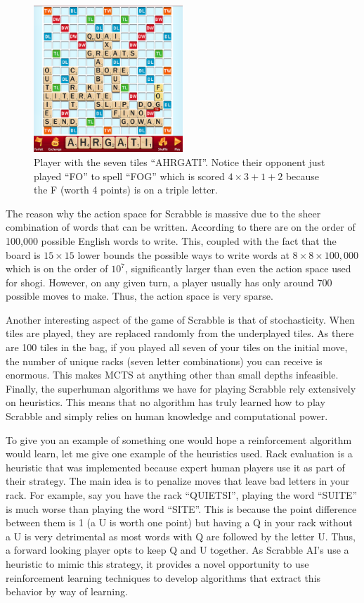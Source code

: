 \documentclass{article}
\begin{document}
  \begin{figure}[H]
    \centering
      \includegraphics[width=0.5\textwidth]{scrabble}
    \caption[Example Scrabble board]{Player with the seven tiles ``AHRGATI''. Notice their opponent just played ``FO'' to spell ``FOG'' which is scored $4 \times 3 + 1 + 2$ because the F (worth 4 points) is on a triple letter.}
    \label{fig:scrabble}
  \end{figure}

  The reason why the action space for Scrabble is massive due to the sheer combination of words that can be written. According to \cite{sheppard_world-championship-caliber_2002} there are on the order of 100,000 possible English words to write. This, coupled with the fact that the board is $15 \times 15$ lower bounds the possible ways to write words at $8 \times 8 \times 100,000$ which is on the order of $10^7$, significantly larger than even the action space used for shogi. However, on any given turn, a player usually has only around 700 possible moves to make. Thus, the action space is very sparse.

  Another interesting aspect of the game of Scrabble is that of stochasticity. When tiles are played, they are replaced randomly from the underplayed tiles. As there are 100 tiles in the bag, if you played all seven of your tiles on the initial move, the number of unique racks (seven letter combinations) you can receive is enormous. This makes MCTS at anything other than small depths infeasible. Finally, the superhuman algorithms we have for playing Scrabble rely extensively on heuristics. This means that no algorithm has truly learned how to play Scrabble and simply relies on human knowledge and computational power.

  To give you an example of something one would hope a reinforcement algorithm would learn, let me give one example of the heuristics used. Rack evaluation is a heuristic that was implemented because expert human players use it as part of their strategy. The main idea is to penalize moves that leave bad letters in your rack. For example, say you have the rack ``QUIETSI'', playing the word ``SUITE'' is much worse than playing the word ``SITE''. This is because the point difference between them is 1 (a U is worth one point) but having a Q in your rack without a U is very detrimental as most words with Q are followed by the letter U. Thus, a forward looking player opts to keep Q and U together. As Scrabble AI's use a heuristic to mimic this strategy, it provides a novel opportunity to use reinforcement learning techniques to develop algorithms that extract this behavior by way of learning.
\end{document}

